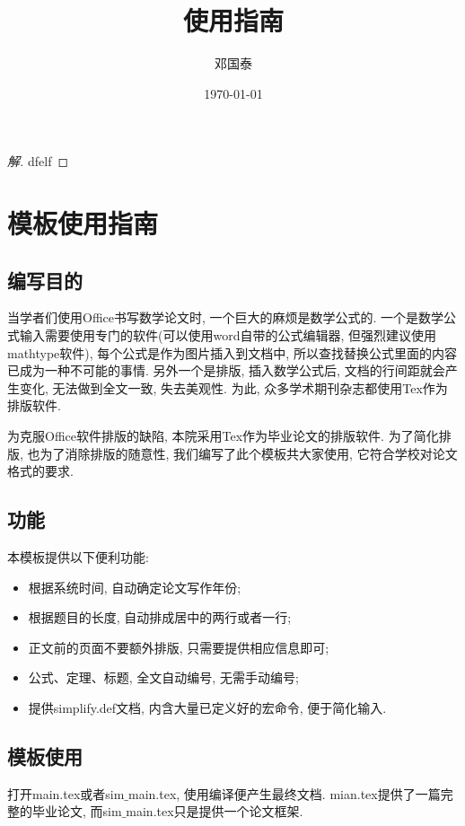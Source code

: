 \documentclass[a4paper,12pt,twoside]{ctexart}
\begin{document}


\title{使用指南}
\date{\today}
\author{邓国泰}
\maketitle
{}\linespread{1.35}
\renewcommand{\baselinestretch}{1.5}
\baselineskip=23pt
\parskip=0pt
\tableofcontents

\begin{proof}[解]
  dfelf
\end{proof}

\section{模板使用指南}
\subsection{编写目的}
    当学者们使用Office书写数学论文时, 一个巨大的麻烦是数学公式的. 一个是数学公式输入需要使用专门的软件(可以使用word自带的公式编辑器, 但强烈建议使用mathtype软件), 每个公式是作为图片插入到文档中, 所以查找替换公式里面的内容已成为一种不可能的事情. 另外一个是排版, 插入数学公式后, 文档的行间距就会产生变化, 无法做到全文一致, 失去美观性. 为此, 众多学术期刊杂志都使用Tex作为排版软件.

    为克服Office软件排版的缺陷, 本院采用Tex作为毕业论文的排版软件.
    为了简化排版, 也为了消除排版的随意性, 我们编写了此个模板共大家使用, 它符合学校对论文格式的要求.

\subsection{功能}
    本模板提供以下便利功能:
    \begin{itemize}
      \item 根据系统时间, 自动确定论文写作年份;
      \item 根据题目的长度, 自动排成居中的两行或者一行;
      \item 正文前的页面不要额外排版, 只需要提供相应信息即可;
      \item 公式、定理、标题, 全文自动编号, 无需手动编号;
      \item 提供simplify.def文档, 内含大量已定义好的宏命令, 便于简化输入.
    \end{itemize}

\subsection{模板使用}
    打开main.tex或者sim$\_$main.tex, 使用编译便产生最终文档. mian.tex提供了一篇完整的毕业论文, 而sim$\_$main.tex只是提供一个论文框架.
\end{document}
